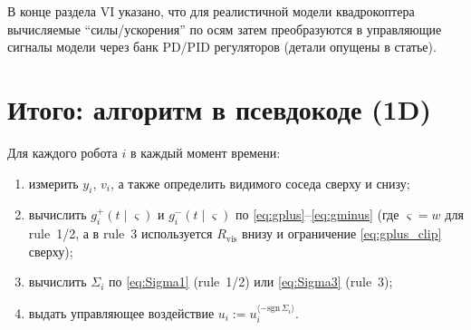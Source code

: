 \documentclass[12pt,a4paper]{article}
\begin{document}
В конце раздела VI указано, что для реалистичной модели квадрокоптера вычисляемые ``силы/ускорения'' по осям затем
преобразуются в управляющие сигналы модели через банк PD/PID регуляторов (детали опущены в статье).

\section*{Итого: алгоритм в псевдокоде (1D)}

Для каждого робота $i$ в каждый момент времени:
\begin{enumerate}
  \item измерить $y_i$, $v_i$, а также определить видимого соседа сверху и снизу;
  \item вычислить $g_i^+(t\mid \varsigma)$ и $g_i^-(t\mid \varsigma)$ по \eqref{eq:gplus}--\eqref{eq:gminus}
        (где $\varsigma=w$ для rule~1/2, а в rule~3 используется $R_{\mathrm{vis}}$ внизу и ограничение \eqref{eq:gplus_clip} сверху);
  \item вычислить $\Sigma_i$ по \eqref{eq:Sigma1} (rule~1/2) или \eqref{eq:Sigma3} (rule~3);
  \item выдать управляющее воздействие $u_i := u_i^{\langle -\mathrm{sgn}\,\Sigma_i\rangle}$.
\end{enumerate}
\end{document}
